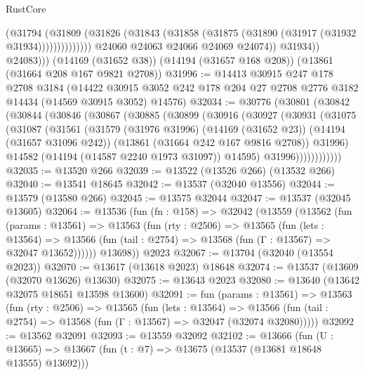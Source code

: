 \begin{lexlean}{RustCore}
\begin{coremodule}
                            (@31794
                              (@31809
                                (@31826
                                  (@31843
                                    (@31858 (@31875 (@31890 (@31917 (@31932 @31934))))))))))))))
                  @24060
                  @24063
                  @24066
                  @24069
                  @24074))
              @31934))
          @24083)))
    (@14169 (@31652 @38))
    (@14194 (@31657 @168 @208))
    (@13861 (@31664 @208 @167 @9821 @2708))
@31996 := @14413
    @30915
    @247
    @178
    @2708
    @3184
    (@14422 @30915 @3052 @242 @178 @204 @27 @2708 @2776 @3182 @14434 (@14569 @30915 @3052) @14576)
@32034 := @30776
    (@30801
      (@30842
        (@30844
          (@30846
            (@30867
              (@30885
                (@30899
                  (@30916
                    (@30927
                      (@30931
                        (@31075
                          (@31087
                            (@31561
                              (@31579
                                (@31976 @31996)
                                (@14169 (@31652 @23))
                                (@14194 (@31657 @31096 @242))
                                (@13861 (@31664 @242 @167 @9816 @2708))
                                @31996)
                              @14582
                              (@14194 (@14587 @2240 @1973 @31097))
                              @14595)
                            @31996))))))))))))
@32035 := @13520 @266
@32039 := @13522 (@13526 @266) (@13532 @266)
@32040 := @13541 @18645
@32042 := @13537 (@32040 @13556)
@32044 := @13579 (@13580 @266)
@32045 := @13575 @32044
@32047 := @13537 (@32045 @13605)
@32064 := @13536
    (fun (fn : @158) =>
    @32042
      (@13559
        (@13562
          (fun (params : @13561) =>
          @13563
            (fun (rty : @2506) =>
            @13565
              (fun (lets : @13564) =>
              @13566 (fun (tail : @2754) => @13568 (fun (Γ : @13567) => @32047 @13652))))))
        @13698))
    @2023
@32067 := @13704 (@32040 (@13554 @2023))
@32070 := @13617 (@13618 @2023) @18648
@32074 := @13537 (@13609 (@32070 @13626) @13630)
@32075 := @13643 @2023
@32080 := @13640 (@13642 @32075 @18651 @13598 @13600)
@32091 := fun (params : @13561) =>
  @13563
    (fun (rty : @2506) =>
    @13565
      (fun (lets : @13564) =>
      @13566 (fun (tail : @2754) => @13568 (fun (Γ : @13567) => @32047 (@32074 @32080)))))
@32092 := @13562 @32091
@32093 := @13559 @32092
@32102 := @13666
    (fun (U : @13665) => @13667 (fun (t : @7) => @13675 (@13537 (@13681 @18648 @13555) @13692)))

\end{coremodule}
\end{lexlean}
